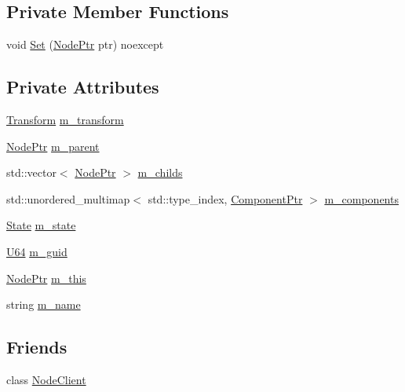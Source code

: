 \subsection*{Private Member Functions}
\begin{DoxyCompactItemize}
\item 
void \hyperlink{classmage_1_1_node_aabbe500cdf7842b663bfcf034de25c5a}{Set} (\hyperlink{classmage_1_1_node_ac575dc006e0ae1134277ade977dc06b6}{Node\+Ptr} ptr) noexcept
\end{DoxyCompactItemize}
\subsection*{Private Attributes}
\begin{DoxyCompactItemize}
\item 
\hyperlink{classmage_1_1_transform}{Transform} \hyperlink{classmage_1_1_node_a0f4dd0c46d9713fd64b0e562862afac6}{m\+\_\+transform}
\item 
\hyperlink{classmage_1_1_node_ac575dc006e0ae1134277ade977dc06b6}{Node\+Ptr} \hyperlink{classmage_1_1_node_aa04f166b52fca444c8756c0864a16cde}{m\+\_\+parent}
\item 
std\+::vector$<$ \hyperlink{classmage_1_1_node_ac575dc006e0ae1134277ade977dc06b6}{Node\+Ptr} $>$ \hyperlink{classmage_1_1_node_a1d1d432f46c61932b5167d27d20cc383}{m\+\_\+childs}
\item 
std\+::unordered\+\_\+multimap$<$ std\+::type\+\_\+index, \hyperlink{classmage_1_1_node_a46b7e1f4f5b98bfa78ed96a80797a4ba}{Component\+Ptr} $>$ \hyperlink{classmage_1_1_node_a804d53398f193b6b06f883131ab7415d}{m\+\_\+components}
\item 
\hyperlink{namespacemage_ae47d13d8477ee94893b9a3947d28eebc}{State} \hyperlink{classmage_1_1_node_a76b775e32bb001c54a9927461eaf7926}{m\+\_\+state}
\item 
\hyperlink{namespacemage_a6672cf3c861707ce4a3235a3eb43941d}{U64} \hyperlink{classmage_1_1_node_a3ef1876293074bfcc01104eb92f1bfdf}{m\+\_\+guid}
\item 
\hyperlink{classmage_1_1_node_ac575dc006e0ae1134277ade977dc06b6}{Node\+Ptr} \hyperlink{classmage_1_1_node_ab056e1563dca22433efa152f4b6da46f}{m\+\_\+this}
\item 
string \hyperlink{classmage_1_1_node_a476cc21fa65cdf9bde0f11fe08b5a707}{m\+\_\+name}
\end{DoxyCompactItemize}
\subsection*{Friends}
\begin{DoxyCompactItemize}
\item 
class \hyperlink{classmage_1_1_node_a6e6c0f9acf9f770577b16be7a41ae51e}{Node\+Client}
\end{DoxyCompactItemize}


